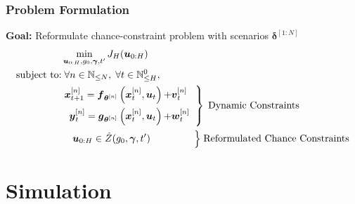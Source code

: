 \documentclass[student, noshadow, itr, english, aspectratio=169]{ITR_LSR_slides}
\begin{document}
\begin{frame}
	\frametitle{Problem Formulation}
\textbf{Goal:} Reformulate chance-constraint problem with scenarios $\boldsymbol{\delta}^{[1:N]}$
\begin{align*} 
 &\min\limits_{\boldsymbol{u}_{0:H}, g_0, \boldsymbol{\gamma}, t'} J_H(\boldsymbol{u}_{0:H}) \\
\text{subject to:}&\; \forall n \in \mathbb{N}_{\leq N}, \;  \forall t \in \mathbb{N}_{\leq H}^0, \\
&\left. 
\begin {aligned}
\boldsymbol{x}_{t+1}^{[n]} = \boldsymbol{f}_{\boldsymbol{\theta}^{[n]}} \left( \boldsymbol{x}_{t}^{[n]} , \boldsymbol{u}_t \right) + & \boldsymbol{v}_{t}^{[n]}\\
\boldsymbol{y}_{t}^{[n]} = \boldsymbol{g}_{\boldsymbol{\theta}^{[n]}} \left( \boldsymbol{x}_{t}^{[n]}, \boldsymbol{u}_t \right) + & \boldsymbol{w}_{t}^{[n]} 
\end{aligned}
 \;\;  \right\} \; \text{Dynamic Constraints} \\
&\;\;\;\; \boldsymbol{u}_{0:H} \in \hat{Z}(g_0, \boldsymbol{\gamma}, t') \;\;\;\;\;\; \;\;\;  \;\;\; \;\;\;\; \Bigl\} \; \text{Reformulated Chance Constraints}
\end{align*}



\end{frame}

\section{Simulation}
\end{document}
